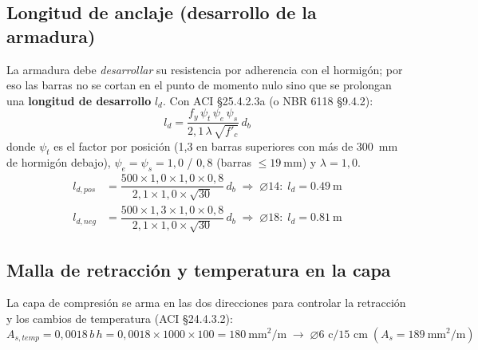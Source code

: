 \subsection{Longitud de anclaje (desarrollo de la armadura)}
La armadura debe \emph{desarrollar} su resistencia por adherencia con el
hormigón; por eso las barras no se cortan en el punto de momento nulo
sino que se prolongan una \textbf{longitud de desarrollo} $l_d$.
Con ACI \S25.4.2.3a (o NBR 6118 \S9.4.2):
\begin{equation}
  l_d = \dfrac{f_y\,\psi_t\,\psi_e\,\psi_s}{2{,}1\,\lambda\,\sqrt{f'_c}}\,d_b
\end{equation}
donde $\psi_t$ es el factor por posición (1{,}3 en barras superiores con
más de \SI{300}{\milli\meter} de hormigón debajo), $\psi_e = \psi_s =
1{,}0$ / $0{,}8$ (barras $\leq \SI{19}{\milli\meter}$) y $\lambda = 1{,}0$.
\begin{align}
  l_{d,pos} &= \dfrac{500 \times 1{,}0 \times 1{,}0 \times 0{,}8}
              {2{,}1 \times 1{,}0 \times \sqrt{30}}\,d_b
              \;\Rightarrow\;
              \varnothing14:\; l_d = \SI{0,49}{\meter}\\
  l_{d,neg} &= \dfrac{500 \times 1{,}3 \times 1{,}0 \times 0{,}8}
              {2{,}1 \times 1{,}0 \times \sqrt{30}}\,d_b
              \;\Rightarrow\;
              \varnothing18:\; l_d = \SI{0,81}{\meter}
\end{align}

\subsection{Malla de retracción y temperatura en la capa}
La capa de compresión se arma en las dos direcciones para controlar la
retracción y los cambios de temperatura (ACI \S24.4.3.2):
\begin{equation}
  A_{s,temp} = 0{,}0018\,b\,h = 0{,}0018 \times 1000 \times 100
  = \SI{180}{\milli\meter^2\per\meter}
  \;\rightarrow\; \varnothing6\text{ c/15 cm}\;(A_s = \SI{189}{\milli\meter^2\per\meter})
\end{equation}

